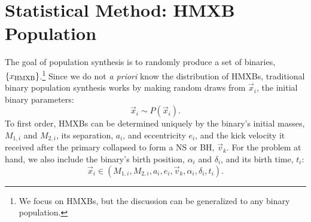 \documentclass[12pt, preprint]{aastex}
\begin{document}

\section{Statistical Method: HMXB Population}

The goal of population synthesis is to randomly produce a set of binaries, $\{x_{\rm HMXB}\}$.\footnote{We focus on HMXBs, but the discussion can be generalized to any binary population.} Since we do not {\it a priori} know the distribution of HMXBs, traditional binary population synthesis works by making random draws from $\vec{x}_i$, the initial binary parameters:
\begin{equation}
\vec{x}_i \sim P(\vec{x}_i).
\end{equation}
To first order, HMXBs can be determined uniquely by the binary's initial masses, $M_{1,i}$ and $M_{2,i}$, its separation, $a_i$, and eccentricity $e_i$, and the kick velocity it received after the primary collapsed to form a NS or BH, $\vec{v}_k$. For the problem at hand, we also include the binary's birth position, $\alpha_i$ and $\delta_i$, and its birth time, $t_i$:
\begin{equation}
\vec{x}_i \in ( M_{1,i}, M_{2,i}, a_i, e_i, \vec{v}_k, \alpha_i, \delta_i, t_i ). \label{eq:x_i}
\end{equation}
\end{document}
